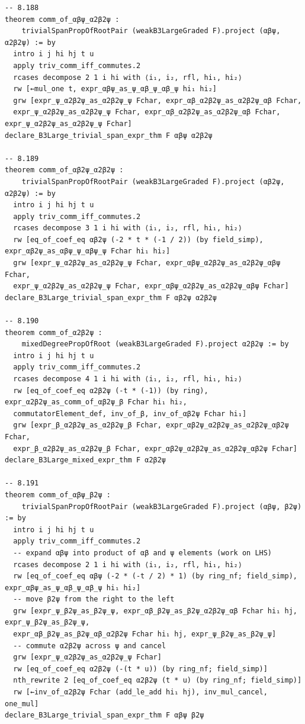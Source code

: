 \documentclass[10pt,a4paper]{article}
\begin{document}
\begin{Verbatim}
-- 8.188
theorem comm_of_αβψ_α2β2ψ :
    trivialSpanPropOfRootPair (weakB3LargeGraded F).project (αβψ, α2β2ψ) := by
  intro i j hi hj t u
  apply triv_comm_iff_commutes.2
  rcases decompose 2 1 i hi with ⟨i₁, i₂, rfl, hi₁, hi₂⟩
  rw [←mul_one t, expr_αβψ_as_ψ_αβ_ψ_αβ_ψ hi₁ hi₂]
  grw [expr_ψ_α2β2ψ_as_α2β2ψ_ψ Fchar, expr_αβ_α2β2ψ_as_α2β2ψ_αβ Fchar,
  expr_ψ_α2β2ψ_as_α2β2ψ_ψ Fchar, expr_αβ_α2β2ψ_as_α2β2ψ_αβ Fchar, expr_ψ_α2β2ψ_as_α2β2ψ_ψ Fchar]
declare_B3Large_trivial_span_expr_thm F αβψ α2β2ψ

-- 8.189
theorem comm_of_αβ2ψ_α2β2ψ :
    trivialSpanPropOfRootPair (weakB3LargeGraded F).project (αβ2ψ, α2β2ψ) := by
  intro i j hi hj t u
  apply triv_comm_iff_commutes.2
  rcases decompose 3 1 i hi with ⟨i₁, i₂, rfl, hi₁, hi₂⟩
  rw [eq_of_coef_eq αβ2ψ (-2 * t * (-1 / 2)) (by field_simp), expr_αβ2ψ_as_αβψ_ψ_αβψ_ψ Fchar hi₁ hi₂]
  grw [expr_ψ_α2β2ψ_as_α2β2ψ_ψ Fchar, expr_αβψ_α2β2ψ_as_α2β2ψ_αβψ Fchar,
  expr_ψ_α2β2ψ_as_α2β2ψ_ψ Fchar, expr_αβψ_α2β2ψ_as_α2β2ψ_αβψ Fchar]
declare_B3Large_trivial_span_expr_thm F αβ2ψ α2β2ψ

-- 8.190
theorem comm_of_α2β2ψ :
    mixedDegreePropOfRoot (weakB3LargeGraded F).project α2β2ψ := by
  intro i j hi hj t u
  apply triv_comm_iff_commutes.2
  rcases decompose 4 1 i hi with ⟨i₁, i₂, rfl, hi₁, hi₂⟩
  rw [eq_of_coef_eq α2β2ψ (-t * (-1)) (by ring), expr_α2β2ψ_as_comm_of_αβ2ψ_β Fchar hi₁ hi₂,
  commutatorElement_def, inv_of_β, inv_of_αβ2ψ Fchar hi₁]
  grw [expr_β_α2β2ψ_as_α2β2ψ_β Fchar, expr_αβ2ψ_α2β2ψ_as_α2β2ψ_αβ2ψ Fchar,
  expr_β_α2β2ψ_as_α2β2ψ_β Fchar, expr_αβ2ψ_α2β2ψ_as_α2β2ψ_αβ2ψ Fchar]
declare_B3Large_mixed_expr_thm F α2β2ψ

-- 8.191
theorem comm_of_αβψ_β2ψ :
    trivialSpanPropOfRootPair (weakB3LargeGraded F).project (αβψ, β2ψ) := by
  intro i j hi hj t u
  apply triv_comm_iff_commutes.2
  -- expand αβψ into product of αβ and ψ elements (work on LHS)
  rcases decompose 2 1 i hi with ⟨i₁, i₂, rfl, hi₁, hi₂⟩
  rw [eq_of_coef_eq αβψ (-2 * (-t / 2) * 1) (by ring_nf; field_simp), expr_αβψ_as_ψ_αβ_ψ_αβ_ψ hi₁ hi₂]
  -- move β2ψ from the right to the left
  grw [expr_ψ_β2ψ_as_β2ψ_ψ, expr_αβ_β2ψ_as_β2ψ_α2β2ψ_αβ Fchar hi₁ hj, expr_ψ_β2ψ_as_β2ψ_ψ,
  expr_αβ_β2ψ_as_β2ψ_αβ_α2β2ψ Fchar hi₁ hj, expr_ψ_β2ψ_as_β2ψ_ψ]
  -- commute α2β2ψ across ψ and cancel
  grw [expr_ψ_α2β2ψ_as_α2β2ψ_ψ Fchar]
  rw [eq_of_coef_eq α2β2ψ (-(t * u)) (by ring_nf; field_simp)]
  nth_rewrite 2 [eq_of_coef_eq α2β2ψ (t * u) (by ring_nf; field_simp)]
  rw [←inv_of_α2β2ψ Fchar (add_le_add hi₁ hj), inv_mul_cancel, one_mul]
declare_B3Large_trivial_span_expr_thm F αβψ β2ψ


\end{Verbatim}
\end{document}
